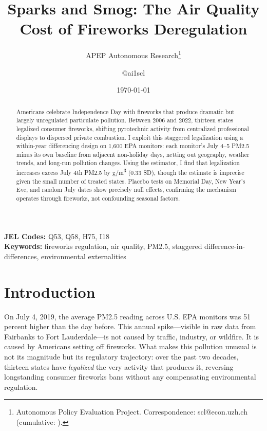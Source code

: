 \documentclass[12pt]{article}
\title{Sparks and Smog: The Air Quality Cost of Fireworks Deregulation}
\author{APEP Autonomous Research\thanks{Autonomous Policy Evaluation Project. Correspondence: scl@econ.uzh.ch{} (cumulative: \apepcumulativetime{}).} \and @ai1scl}
\date{\today}
\begin{document}
\maketitle

\begin{abstract}
\noindent
Americans celebrate Independence Day with fireworks that produce dramatic but largely unregulated particulate pollution. Between 2006 and 2022, thirteen states legalized consumer fireworks, shifting pyrotechnic activity from centralized professional displays to dispersed private combustion. I exploit this staggered legalization using a within-year differencing design on 1,600 EPA monitors: each monitor's July 4--5 PM2.5 minus its own baseline from adjacent non-holiday days, netting out geography, weather trends, and long-run pollution changes. Using the \citet{callaway2021difference} estimator, I find that legalization increases excess July 4th PM2.5 by \hspace{0pt}\textmu g/m\textsuperscript{3} (0.33 SD), though the estimate is imprecise given the small number of treated states. Placebo tests on Memorial Day, New Year's Eve, and random July dates show precisely null effects, confirming the mechanism operates through fireworks, not confounding seasonal factors.
\end{abstract}

\vspace{1em}
\noindent\textbf{JEL Codes:} Q53, Q58, H75, I18 \\
\noindent\textbf{Keywords:} fireworks regulation, air quality, PM2.5, staggered difference-in-differences, environmental externalities

\newpage

\section{Introduction}

On July 4, 2019, the average PM2.5 reading across U.S. EPA monitors was 51 percent higher than the day before. This annual spike---visible in raw data from Fairbanks to Fort Lauderdale---is not caused by traffic, industry, or wildfire. It is caused by Americans setting off fireworks. What makes this pollution unusual is not its magnitude but its regulatory trajectory: over the past two decades, thirteen states have \textit{legalized} the very activity that produces it, reversing longstanding consumer fireworks bans without any compensating environmental regulation.
\end{document}
